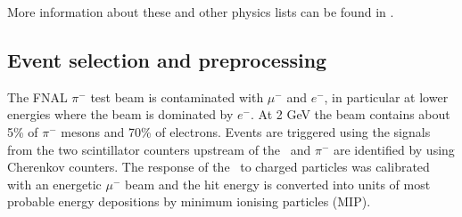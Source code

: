 More information about these and other physics lists can be found in \cite{bib:G4pl}.

\subsection{Event selection and preprocessing}

The FNAL $\pi^-$ test beam is contaminated with $\mu^-$ and $e^-$, in particular at lower energies where the beam is dominated by $e^-$. 
At 2 GeV the beam contains about 5\% of $\pi^-$ mesons and 70\% of electrons. 
Events are triggered using the signals from the two scintillator counters upstream of the \ecal\ and $\pi^-$ are identified by using Cherenkov counters.
The response of the \ecal\ to charged particles was calibrated with  an energetic $\mu^-$ beam \cite{li:tel-00430432} and the hit energy is converted into units of most probable energy depositions by minimum ionising particles (MIP). 

